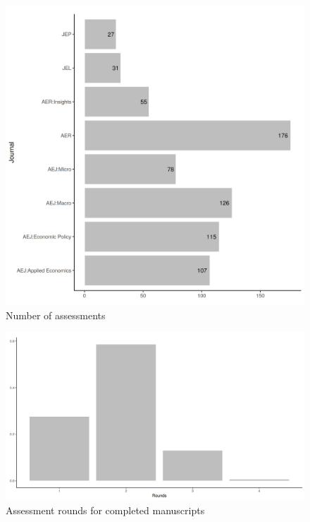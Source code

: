 \documentclass[PP]{AEA}
\begin{document}
\begin{figure}
    \centering
    \includegraphics[height=0.4\textheight]{images/n_assessments_journal_plot.png}
    \caption{Number of assessments}
    \label{fig:pre:assessments_journal}
\end{figure}



\begin{figure}
    \centering
    \includegraphics[height=0.4\textheight]{images/n_rounds_plot.png}
    \caption{Assessment rounds for completed manuscripts}
    \label{fig:pre:rounds}
\end{figure}
\end{document}
